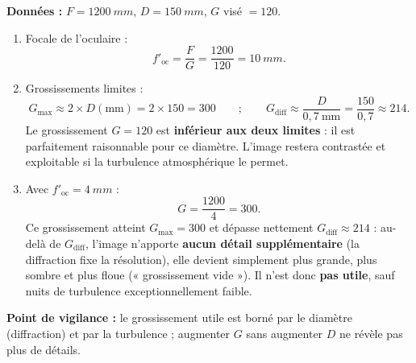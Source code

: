 \documentclass[11pt]{article}
\begin{document}
\begin{corrige}
\textbf{Données :} $F = \SI{1200}{mm}$, $D = \SI{150}{mm}$, $G$ visé $= 120$.
\begin{enumerate}
    \item Focale de l'oculaire :
    \[ f'_{\text{oc}} = \frac{F}{G} = \frac{1200}{120} = \SI{10}{mm}. \]
    \item Grossissements limites :
    \[ G_{\max} \approx 2 \times D(\text{mm}) = 2 \times 150 = 300 \qquad ; \qquad G_{\text{diff}} \approx \frac{D}{0,7\ \text{mm}} = \frac{150}{0,7} \approx 214. \]
    Le grossissement $G = 120$ est \textbf{inférieur aux deux limites} : il est parfaitement raisonnable pour ce diamètre. L'image restera contrastée et exploitable si la turbulence atmosphérique le permet.
    \item Avec $f'_{\text{oc}} = \SI{4}{mm}$ :
    \[ G = \frac{1200}{4} = 300. \]
    Ce grossissement atteint $G_{\max} = 300$ et dépasse nettement $G_{\text{diff}} \approx 214$ : au-delà de $G_{\text{diff}}$, l'image n'apporte \textbf{aucun détail supplémentaire} (la diffraction fixe la résolution), elle devient simplement plus grande, plus sombre et plus floue (« grossissement vide »). Il n'est donc \textbf{pas utile}, sauf nuits de turbulence exceptionnellement faible.
\end{enumerate}
\textbf{Point de vigilance :} le grossissement utile est borné par le diamètre (diffraction) et par la turbulence ; augmenter $G$ sans augmenter $D$ ne révèle pas plus de détails.
\end{corrige}
\end{document}
